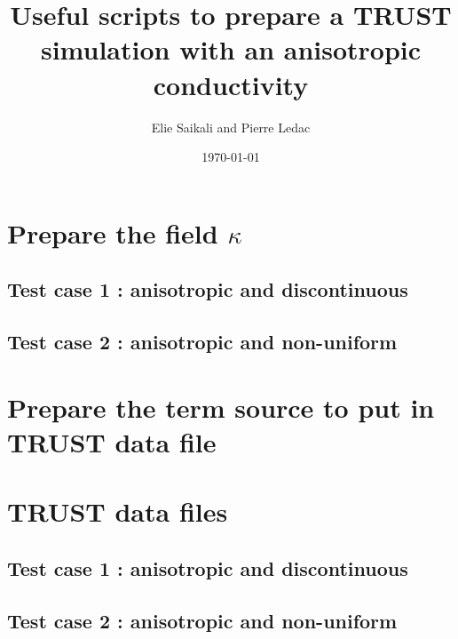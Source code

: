 \documentclass{article}
\begin{document}
       
 	\title{Useful scripts to prepare a TRUST simulation with an anisotropic conductivity}
 	\author{Elie Saikali and Pierre Ledac}
	\date{\today}

	\maketitle

	\section{Prepare the field $\kappa$}
	\subsection{Test case 1 : anisotropic and discontinuous}
	

	\subsection{Test case 2 : anisotropic and non-uniform}
	

	\section{Prepare the term source to put in TRUST data file}
	

	\section{TRUST data files}
	\subsection{Test case 1 : anisotropic and discontinuous}
	
	
	\subsection{Test case 2 : anisotropic and non-uniform}
	
\end{document}
